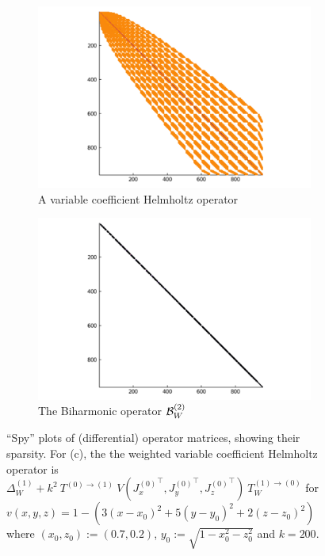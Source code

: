 \documentclass[11pt, oneside]{article}   	%
\begin{document}
\begin{figure}[t]
	\medskip
	\begin{subfigure}{0.45\textwidth}
		\includegraphics[scale=0.3]{sparsity-of-helmholtz}
		\centering
		\caption{A variable coefficient Helmholtz operator}
	\end{subfigure}\hfil %
	\begin{subfigure}{0.45\textwidth}
		\includegraphics[scale=0.23]{sparsity-of-biharmonic}
		\centering
		\caption{The Biharmonic operator $\mathcal{B}_W^{(2)}$} 
	\end{subfigure}\hfil %
	\caption{\enquote{Spy} plots of (differential) operator matrices, showing their sparsity. For (c), the the weighted variable coefficient Helmholtz operator is $\Delta^{(1)}_W + k^2 \: T^{(0)\to(1)} \: V({J_x^{(0)}}^\top, {J_y^{(0)}}^\top, {J_z^{(0)}}^\top) \: T_W^{(1)\to(0)}$ for $v(x,y,z) = 1 - (3(x-x_0)^2 + 5(y-y_0)^2 + 2(z-z_0)^2)$ where $(x_0, z_0) := (0.7, 0.2)$, $y_0 := \sqrt{1 - x_0^2 - z_0^2}$ and $k = 200$.}
	\label{fig:sparsity}
\end{figure}
\end{document}
